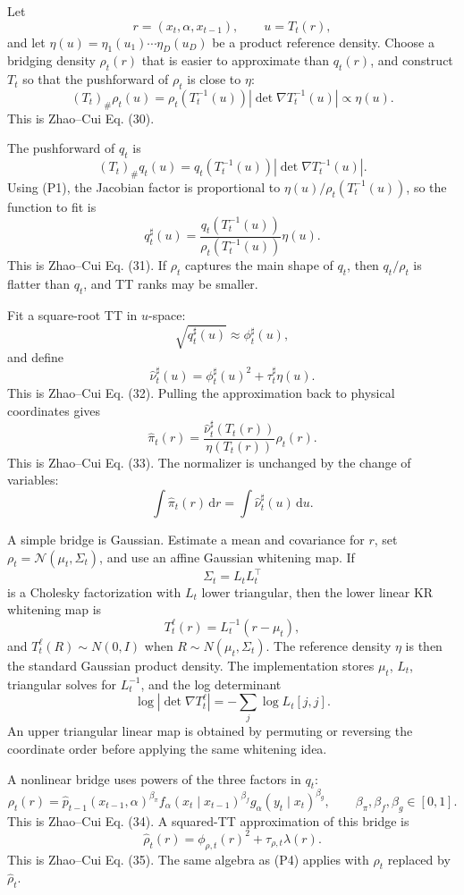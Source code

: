 \documentclass[11pt]{article}
\newcommand{\dd}{\,\mathrm d}
\begin{document}
Let
\[
    r=(x_t,\alpha,x_{t-1}),\qquad u=T_t(r),
\]
and let \(\eta(u)=\eta_1(u_1)\cdots\eta_D(u_D)\) be a product reference density.
Choose a bridging density \(\rho_t(r)\) that is easier to approximate than
\(q_t(r)\), and construct \(T_t\) so that the pushforward of \(\rho_t\) is close
to \(\eta\):
\[
    (T_t)_\#\rho_t(u)
    =
    \rho_t(T_t^{-1}(u))
    \left|\det\nabla T_t^{-1}(u)\right|
    \propto
    \eta(u).
    \tag{P1}
\]
This is Zhao--Cui Eq. (30).

The pushforward of \(q_t\) is
\[
    (T_t)_\#q_t(u)
    =
    q_t(T_t^{-1}(u))
    \left|\det\nabla T_t^{-1}(u)\right|.
\]
Using (P1), the Jacobian factor is proportional to
\(\eta(u)/\rho_t(T_t^{-1}(u))\), so the function to fit is
\[
    q^\sharp_t(u)
    =
    \frac{q_t(T_t^{-1}(u))}
    {\rho_t(T_t^{-1}(u))}
    \eta(u).
    \tag{P2}
\]
This is Zhao--Cui Eq. (31).  If \(\rho_t\) captures the main shape of \(q_t\),
then \(q_t/\rho_t\) is flatter than \(q_t\), and TT ranks may be smaller.

Fit a square-root TT in \(u\)-space:
\[
    \sqrt{q^\sharp_t(u)}\approx \phi^\sharp_t(u),
\]
and define
\[
    \widehat\nu^\sharp_t(u)
    =
    \phi^\sharp_t(u)^2+\tau^\sharp_t\eta(u).
    \tag{P3}
\]
This is Zhao--Cui Eq. (32).  Pulling the approximation back to physical
coordinates gives
\[
    \widehat\pi_t(r)
    =
    \frac{\widehat\nu^\sharp_t(T_t(r))}
    {\eta(T_t(r))}
    \rho_t(r).
    \tag{P4}
\]
This is Zhao--Cui Eq. (33).  The normalizer is unchanged by the change of
variables:
\[
    \int \widehat\pi_t(r)\dd r
    =
    \int \widehat\nu^\sharp_t(u)\dd u.
    \tag{P5}
\]

A simple bridge is Gaussian.  Estimate a mean and covariance for \(r\), set
\(\rho_t=\mathcal N(\mu_t,\Sigma_t)\), and use an affine Gaussian whitening map.
If
\[
    \Sigma_t=L_tL_t^\top
    \tag{P6a}
\]
is a Cholesky factorization with \(L_t\) lower triangular, then the lower
linear KR whitening map is
\[
    T_t^{\ell}(r)
    =
    L_t^{-1}(r-\mu_t),
    \tag{P6b}
\]
and \(T_t^{\ell}(R)\sim N(0,I)\) when \(R\sim N(\mu_t,\Sigma_t)\).  The
reference density \(\eta\) is then the standard Gaussian product density.  The
implementation stores \(\mu_t\), \(L_t\), triangular solves for \(L_t^{-1}\),
and the log determinant
\[
    \log|\det\nabla T_t^{\ell}|
    =
    -\sum_j\log L_t[j,j].
    \tag{P6c}
\]
An upper triangular linear map is obtained by permuting or reversing the
coordinate order before applying the same whitening idea.

A nonlinear bridge uses powers of the three factors in \(q_t\):
\[
    \rho_t(r)
    =
    \widehat p_{t-1}(x_{t-1},\alpha)^{\beta_\pi}
    f_\alpha(x_t\mid x_{t-1})^{\beta_f}
    g_\alpha(y_t\mid x_t)^{\beta_g},
    \qquad
    \beta_\pi,\beta_f,\beta_g\in[0,1].
    \tag{P6}
\]
This is Zhao--Cui Eq. (34).  A squared-TT approximation of this bridge is
\[
    \widehat\rho_t(r)
    =
    \phi_{\rho,t}(r)^2+\tau_{\rho,t}\lambda(r).
    \tag{P7}
\]
This is Zhao--Cui Eq. (35).  The same algebra as (P4) applies with
\(\rho_t\) replaced by \(\widehat\rho_t\).
\end{document}
